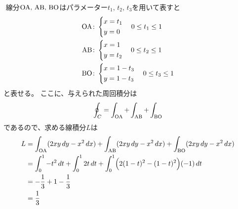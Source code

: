 
\begin{ans*}
  ${}$
  線分$\rm{OA},\,\rm{AB},\,\rm{BO}$はパラメーター$t_{1},\,t_{2},\,t_{3}$を用いて表すと
  \begin{align}
    \rm{OA}&\colon
    \begin{dcases*}
      x = t_{1} \\
      y = 0
    \end{dcases*} \quad 0\leq t_{1} \leq 1 \\
    \rm{AB}&\colon
    \begin{dcases*}
      x = 1 \\
      y = t_{2}
    \end{dcases*} \quad 0\leq t_{2} \leq 1 \\
    \rm{BO}&\colon
    \begin{dcases*}
      x = 1 - t_{3} \\
      y = 1 - t_{3}
    \end{dcases*} \quad 0\leq t_{3} \leq 1
  \end{align}
  と表せる。
  ここに、与えられた周回積分は
  \begin{gather}
    \oint_{C} = \int_{\rm{OA}} + \int_{\rm{AB}} + \int_{\rm{BO}}
  \end{gather}
  であるので、求める線積分$L$は
  \begin{align}
    L
    &= \int_{\rm{OA}}(2xy\,dy - x^2\,dx)
    + \int_{\rm{AB}}(2xy\,dy - x^2\,dx)
    + \int_{\rm{BO}}(2xy\,dy - x^2\,dx) \\
    &= \int_{0}^{1} -t^2 \,dt
    + \int_{0}^{1} 2t\,dt
    + \int_{0}^{1} \Bigl(2(1-t)^2 - (1-t)^2\Bigr)(-1)\,dt \\
    &= -\frac{1}{3} + 1 - \frac{1}{3} \\
    &= \frac{1}{3}
  \end{align}
\end{ans*}

